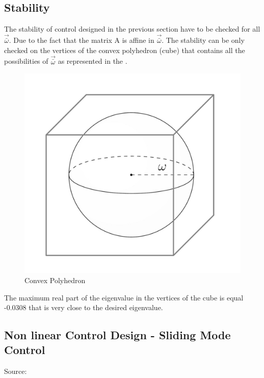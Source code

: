 \subsection{Stability}
The stability of control designed in the previous section have to be checked for all $\vec{\bar{\omega}}$. Due to the fact that the matrix A is affine in $\vec{\bar{\omega}}$. The stability can be only checked on the vertices of the convex polyhedron (cube) that contains all the possibilities of $\vec{\bar{\omega}}$ as represented in the . \cite{NLCS}
\begin{figure}[H]
	\centering
	\includegraphics[width=0.4\linewidth]{figures/cs}
	\caption{Convex Polyhedron}
	\label{fig:sta_PID}
\end{figure} 
The maximum real part of the eigenvalue in the vertices of the cube is equal -0.0308 that is very close to the desired eigenvalue.
%
\subsection{Non linear Control Design - Sliding Mode Control }
Source: \cite{WR}

